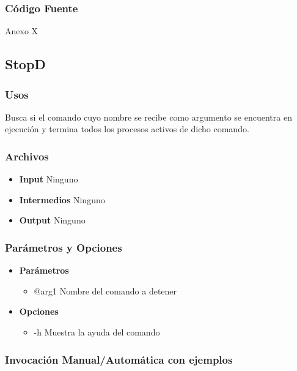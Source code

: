 \documentclass[a4paper,10pt,titlepage]{article}
\begin{document}
		\subsubsection{C\'odigo Fuente}
			Anexo X


	\subsection{StopD}
		\subsubsection{Usos}

		Busca si el comando cuyo nombre se recibe como argumento se encuentra en ejecuci\'on y termina todos los procesos activos de dicho comando.


		\subsubsection{Archivos}
			\begin {itemize}
				\item \textbf{Input } {Ninguno}
				\item \textbf{Intermedios } {Ninguno}
				\item \textbf{Output } {Ninguno}
			\end{itemize}

		\subsubsection{Par\'ametros y Opciones}
			\begin {itemize}
				\item \textbf{Par\'ametros} {
					\begin{itemize}
						\item {@arg1 }{Nombre del comando a detener}
					\end{itemize}
				}
				\item \textbf{Opciones}{
					\begin{itemize}
						\item {-h }{Muestra la ayuda del comando} 
					\end{itemize}
				}

			\end{itemize}
	
		\subsubsection{Invocaci\'on Manual/Autom\'atica con ejemplos}
\end{document}
